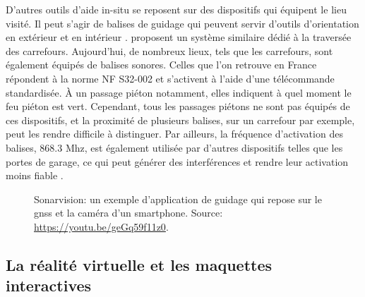 \newpar{}

D'autres outils d'aide in-situ se reposent sur des dispositifs qui équipent le lieu visité. Il peut s'agir de balises de guidage qui peuvent servir d'outils d'orientation en extérieur et en intérieur \citep{Ahmetovic2016, Cheraghi2017}. \citet{Shin2022} proposent un système similaire dédié à la traversée des carrefours. Aujourd'hui, de nombreux lieux, tels que les carrefours, sont également équipés de balises sonores. Celles que l'on retrouve en France répondent à la norme NF S32-002 \citep{NFS32002_2004} et s'activent à l'aide d'une télécommande standardisée. À un passage piéton notamment, elles indiquent à quel moment le feu piéton est vert. Cependant, tous les passages piétons ne sont pas équipés de ces dispositifs, et la proximité de plusieurs balises, sur un carrefour par exemple, peut les rendre difficile à distinguer. Par ailleurs, la fréquence d'activation des balises, 868.3 Mhz, est également utilisée par d'autres dispositifs telles que les portes de garage, ce qui peut générer des interférences et rendre leur activation moins fiable \citep{Rahal2021}.

\begin{figure}[ht]
    \centering
    \caption[Application mobile de guidage]{Sonarvision: un exemple d'application de guidage qui repose sur le \gls{gnss} et la caméra d'un smartphone. Source: \url{https://youtu.be/geGq59f11z0}.}
    \label{fig:dispositif_in_situ}
\end{figure}

\subsection{La réalité virtuelle et les maquettes interactives}


